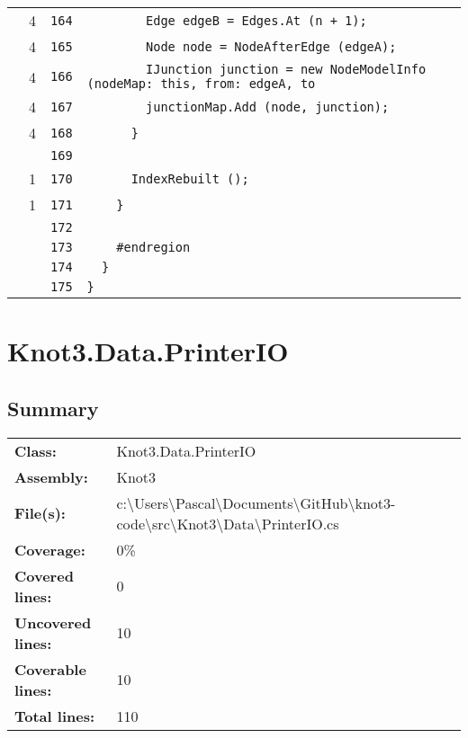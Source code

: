 \documentclass[a4paper,10pt]{article}
\begin{document}
\begin{longtable}[l]{lrrl}
\cellcolor{green} & 4 & \verb~164~ & \verb~        Edge edgeB = Edges.At (n + 1);~\\
\cellcolor{green} & 4 & \verb~165~ & \verb~        Node node = NodeAfterEdge (edgeA);~\\
\cellcolor{green} & 4 & \verb~166~ & \verb~        IJunction junction = new NodeModelInfo (nodeMap: this, from: edgeA, to~\\
\cellcolor{green} & 4 & \verb~167~ & \verb~        junctionMap.Add (node, junction);~\\
\cellcolor{green} & 4 & \verb~168~ & \verb~      }~\\
\cellcolor{gray} &  & \verb~169~ & \verb~~\\
\cellcolor{green} & 1 & \verb~170~ & \verb~      IndexRebuilt ();~\\
\cellcolor{green} & 1 & \verb~171~ & \verb~    }~\\
\cellcolor{gray} &  & \verb~172~ & \verb~~\\
\cellcolor{gray} &  & \verb~173~ & \verb~    #endregion~\\
\cellcolor{gray} &  & \verb~174~ & \verb~  }~\\
\cellcolor{gray} &  & \verb~175~ & \verb~}~\\
\end{longtable}
\newpage
\section{Knot3.Data.PrinterIO}
\subsection{Summary}
\begin{longtable}[l]{ll}
\textbf{Class:} & Knot3.Data.PrinterIO\\
\textbf{Assembly:} & Knot3\\
\textbf{File(s):} & \begin{minipage}[t]{12cm}{c:\textbackslash Users\textbackslash Pascal\textbackslash Documents\textbackslash GitHub\textbackslash knot3-code\textbackslash src\textbackslash Knot3\textbackslash Data\textbackslash PrinterIO.cs}\end{minipage} \\
\textbf{Coverage:} & 0\%\\
\textbf{Covered lines:} & 0\\
\textbf{Uncovered lines:} & 10\\
\textbf{Coverable lines:} & 10\\
\textbf{Total lines:} & 110\\
\end{longtable}
\end{document}
